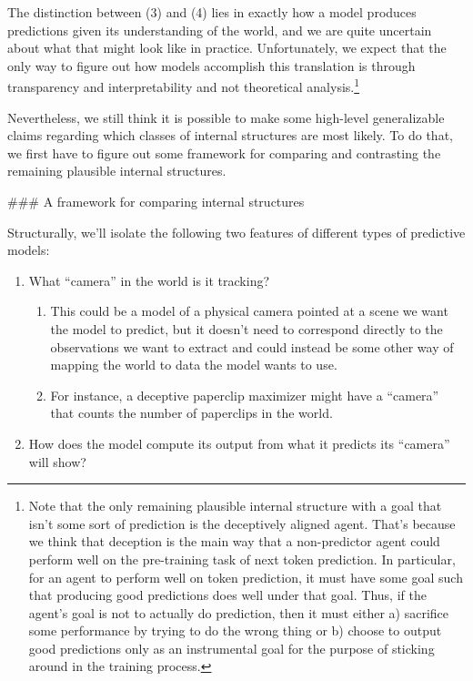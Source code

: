 {The distinction between (3) and (4) lies in exactly how a model produces predictions given its understanding of the world, and we are quite uncertain about what that might look like in practice. Unfortunately, we expect that the only way to figure out how models accomplish this translation is through transparency and interpretability and not theoretical analysis.\footnote{Note that the only remaining plausible internal structure with a goal that isn't some sort of prediction is the deceptively aligned agent. That's because we think that deception is the main way that a non-predictor agent could perform well on the pre-training task of next token prediction. In particular, for an agent to perform well on token prediction, it must have some goal such that producing good predictions does well under that goal. Thus, if the agent's goal is not to actually do prediction, then it must either a) sacrifice some performance by trying to do the wrong thing or b) choose to output good predictions only as an instrumental goal for the purpose of sticking around in the training process.}

Nevertheless, we still think it is possible to make some high-level generalizable claims regarding which classes of internal structures are most likely. To do that, we first have to figure out some framework for comparing and contrasting the remaining plausible internal structures.


### A framework for comparing internal structures

Structurally, we'll isolate the following two features of different types of predictive models:



\begin{enumerate}
\item What ``camera'' in the world is it tracking?
    \begin{enumerate}
    \item This could be a model of a physical camera pointed at a scene we want the model to predict, but it doesn't need to correspond directly to the observations we want to extract and could instead be some other way of mapping the world to data the model wants to use.
    \item For instance, a deceptive paperclip maximizer might have a ``camera'' that counts the number of paperclips in the world.
    \end{enumerate}
\item How does the model compute its output from what it predicts its ``camera'' will show?
\end{enumerate}

}
